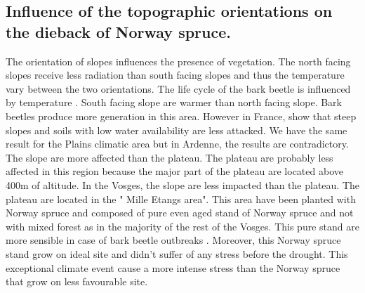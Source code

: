\documentclass[3p,procedia]{elsarticle}
\begin{document}
	


\subsection{Influence of the topographic orientations on the dieback of Norway spruce.}


The orientation of slopes influences the presence of vegetation. The north facing slopes receive less radiation than south facing slopes and thus the temperature vary between the two orientations.
The life cycle of the bark beetle is influenced by temperature \citep{baier_phenipscomprehensive_2007}. 
South facing slope are warmer than north facing slope.
Bark beetles produce more generation in this area. 
However in France, \cite{nardi_drought_2022} show that steep slopes and soils with low water availability are less attacked.
We have the same result for the Plains climatic area but in Ardenne, the results are contradictory. The slope are more affected than the plateau. The plateau are probably less affected in this region because the major part of the plateau are located above 400m of altitude.
In the Vosges, the slope are less impacted than the plateau. 
The plateau are located in the " Mille Etangs area". This area have been planted with Norway spruce and composed of pure even aged stand of Norway spruce and not with mixed forest as in the majority of the rest of the Vosges.
This pure stand are more sensible in case of bark beetle outbreaks \citep{jactel_2021}.
Moreover, this Norway spruce stand grow on ideal site and didn't suffer of any stress
before the drought. 
This exceptional climate event cause a more intense stress than the Norway spruce that grow on less favourable site.
\end{document}
